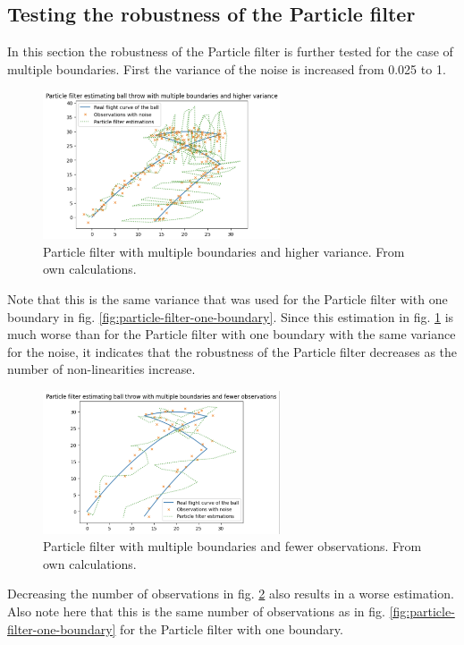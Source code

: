 \documentclass[conference]{IEEEtran}
\begin{document}
\subsection{Testing the robustness of the Particle filter}
In this section the robustness of the Particle filter is further tested for the case of multiple boundaries.
First the variance of the noise is increased from 0.025 to 1.
\begin{figure}
	\centering
	\includegraphics[width=70mm]{figs/particle-filter-multiple-boundaries-higher-variance}
	\caption{Particle filter with multiple boundaries and higher variance. From own calculations.}
	\label{fig:particle-filter-multiple-boundaries-higher-variance}
\end{figure}

Note that this is the same variance that was used for the Particle filter with one boundary in fig. \ref{fig:particle-filter-one-boundary}.
Since this estimation in fig. \ref{fig:particle-filter-multiple-boundaries-higher-variance} is much worse than for the Particle filter with one boundary with the same variance for the noise, it indicates that the robustness of the Particle filter decreases as the number of non-linearities increase. 
\begin{figure}
	\centering
	\includegraphics[width=70mm]{figs/particle-filter-multiple-boundaries-fewer-observations}
	\caption{Particle filter with multiple boundaries and fewer observations. From own calculations.}
	\label{fig:particle-filter-multiple-boundaries-fewer-observations}
\end{figure}

Decreasing the number of observations in fig. \ref{fig:particle-filter-multiple-boundaries-fewer-observations} also results in a worse estimation.
Also note here that this is the same number of observations as in fig. \ref{fig:particle-filter-one-boundary} for the Particle filter with one boundary.
\end{document}

